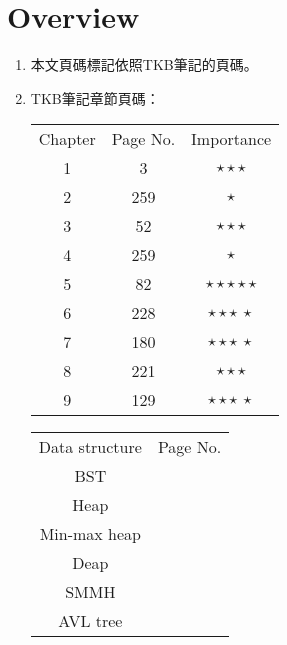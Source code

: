 \section{Overview}

\begin{enumerate}
    \item 本文頁碼標記依照TKB筆記\cite{2}的頁碼。
    \item TKB筆記\cite{2}章節頁碼：
    \begin{table}[H]
        \centering
        \begin{tabular}{|c|c|c|}
            \hline
            Chapter & Page No. & Importance \\
            \Xhline{2\arrayrulewidth}
            1 & 3 & $\star\star\star$ \\
            \hline
            2 & 259 & $\star$ \\
            \hline
            3 & 52 & $\star\star\star$ \\
            \hline
            4 & 259 & $\star$ \\
            \hline
            5 & 82 & $\star\star\star\star\star$ \\
            \hline
            6 & 228 & $\star\star\star \ \star$ \\
            \hline
            7 & 180 & $\star\star\star \ \star$ \\
            \hline
            8 & 221 & $\star\star\star$ \\
            \hline
            9 & 129 & $\star\star\star \ \star$ \\
            \hline
        \end{tabular}
    \end{table}
    \begin{table}[H]
        \centering
        \begin{tabular}{|c|c|}
            \hline
            Data structure & Page No. \\
            \Xhline{2\arrayrulewidth}
            BST & \pageref{bst} \\
            \hline
            Heap & \pageref{heap} \\
            \hline
            Min-max heap & \pageref{min-maxheap} \\
            \hline
            Deap & \pageref{deap} \\
            \hline
            SMMH & \pageref{smmh} \\
            \hline
            AVL tree & \pageref{avltree} \\

\end{tabular}
\end{table}
\end{enumerate}
